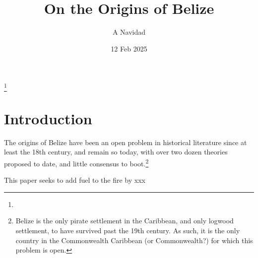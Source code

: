 \documentclass{amsart}
\theoremstyle{definition}
\theoremstyle{remark}
\begin{document}
%
%
\title{On the Origins of Belize}
\author{A Navidad}
\address{Harvard College, Cambridge, MA, US}
\date{12 Feb 2025}
\thanks{} %
\begin{abstract}
\end{abstract}
\keywords{}
\maketitle
%
%
%
\section{Introduction}
\label{s:intro}
	The origins of Belize have been an open problem in historical literature since at least the 18th century, and remain so today, with over two dozen theories proposed to date, and little consensus to boot.\footnote{Belize is the only pirate settlement in the Caribbean, and only logwood settlement, to have survived past the 19th century. As such, it is the only country in the Commonwealth Caribbean (or Commonwealth?) for which this problem is open.}
	
	This paper seeks to add fuel to the fire by xxx
%
%
%
\end{document}
